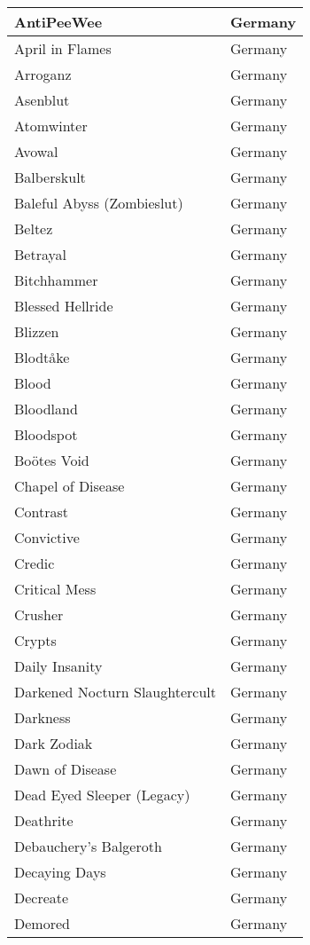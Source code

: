 \documentclass[12pt, a4paper, twoside]{report}
\begin{document}
\begin{center}
\begin{longtable}{|p{5cm}|p{5cm}|}
AntiPeeWee & Germany \\ \hline
April in Flames & Germany \\ \hline
Arroganz & Germany \\ \hline
Asenblut & Germany \\ \hline
Atomwinter & Germany \\ \hline
Avowal & Germany \\ \hline
Balberskult & Germany \\ \hline
Baleful Abyss (Zombieslut) & Germany \\ \hline
Beltez & Germany \\ \hline
Betrayal & Germany \\ \hline
Bitchhammer & Germany \\ \hline
Blessed Hellride & Germany \\ \hline
Blizzen & Germany \\ \hline
Blodtåke & Germany \\ \hline
Blood & Germany \\ \hline
Bloodland & Germany \\ \hline
Bloodspot & Germany \\ \hline
Boötes Void & Germany \\ \hline
Chapel of Disease & Germany \\ \hline
Contrast & Germany \\ \hline
Convictive & Germany \\ \hline
Credic & Germany \\ \hline
Critical Mess & Germany \\ \hline
Crusher & Germany \\ \hline
Crypts & Germany \\ \hline
Daily Insanity & Germany \\ \hline
Darkened Nocturn Slaughtercult & Germany \\ \hline
Darkness & Germany \\ \hline
Dark Zodiak & Germany \\ \hline
Dawn of Disease & Germany \\ \hline
Dead Eyed Sleeper (Legacy) & Germany \\ \hline
Deathrite & Germany \\ \hline
Debauchery's Balgeroth & Germany \\ \hline
Decaying Days & Germany \\ \hline
Decreate & Germany \\ \hline
Demored & Germany \\ \hline

\end{longtable}
\end{center}
\end{document}
